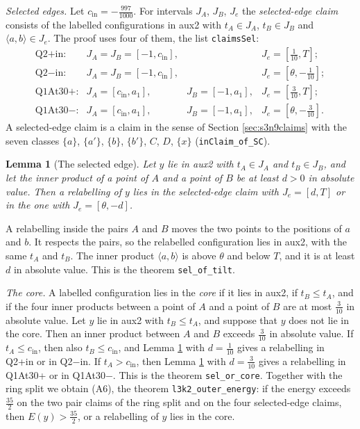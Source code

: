 \documentclass[reqno,a4paper,11pt]{amsart}
\numberwithin{equation}{section}
\newtheorem{lemma}[theorem]{Lemma}
\newcommand{\lean}[1]{\texttt{#1}}
\begin{document}
\emph{Selected edges.} Let $c_{\mathrm{in}} = -\tfrac{997}{1000}$. For intervals $J_A$, $J_B$, $J_e$ the \emph{selected-edge claim} consists of the labelled configurations in aux2 with $t_A \in J_A$, $t_B \in J_B$ and $\langle a, b \rangle \in J_e$. The proof uses four of them, the list \lean{claimsSel}:
$$
\begin{array}{llll}
\text{Q2+in:} & J_A = J_B = [-1, c_{\mathrm{in}}], & & J_e = [\tfrac{1}{10}, T]; \\[2pt]
\text{Q2$-$in:} & J_A = J_B = [-1, c_{\mathrm{in}}], & & J_e = [\theta, -\tfrac{1}{10}]; \\[2pt]
\text{Q1At30+:} & J_A = [c_{\mathrm{in}}, a_1], & J_B = [-1, a_1], & J_e = [\tfrac{3}{10}, T]; \\[2pt]
\text{Q1At30$-$:} & J_A = [c_{\mathrm{in}}, a_1], & J_B = [-1, a_1], & J_e = [\theta, -\tfrac{3}{10}].
\end{array}
$$
A selected-edge claim is a claim in the sense of Section \ref{sec:s3n9claims} with the seven classes $\{a\}$, $\{a'\}$, $\{b\}$, $\{b'\}$, $C$, $D$, $\{x\}$ (\lean{inClaim\_of\_SC}).

\begin{lemma}[The selected edge]\label{lma:seledge}
Let $y$ lie in aux2 with $t_A \in J_A$ and $t_B \in J_B$, and let the inner product of a point of $A$ and a point of $B$ be at least $d > 0$ in absolute value. Then a relabelling of $y$ lies in the selected-edge claim with $J_e = [d, T]$ or in the one with $J_e = [\theta, -d]$.
\end{lemma}

A relabelling inside the pairs $A$ and $B$ moves the two points to the positions of $a$ and $b$. It respects the pairs, so the relabelled configuration lies in aux2, with the same $t_A$ and $t_B$. The inner product $\langle a, b \rangle$ is above $\theta$ and below $T$, and it is at least $d$ in absolute value. This is the theorem \lean{sel\_of\_tilt}.

\emph{The core.} A labelled configuration lies in the \emph{core} if it lies in aux2, if $t_B \leq t_A$, and if the four inner products between a point of $A$ and a point of $B$ are at most $\tfrac{3}{10}$ in absolute value. Let $y$ lie in aux2 with $t_B \leq t_A$, and suppose that $y$ does not lie in the core. Then an inner product between $A$ and $B$ exceeds $\tfrac{3}{10}$ in absolute value. If $t_A \leq c_{\mathrm{in}}$, then also $t_B \leq c_{\mathrm{in}}$, and Lemma \ref{lma:seledge} with $d = \tfrac{1}{10}$ gives a relabelling in Q2+in or in Q2$-$in. If $t_A > c_{\mathrm{in}}$, then Lemma \ref{lma:seledge} with $d = \tfrac{3}{10}$ gives a relabelling in Q1At30+ or in Q1At30$-$. This is the theorem \lean{sel\_or\_core}. Together with the ring split we obtain (A6), the theorem \lean{l3k2\_outer\_energy}: if the energy exceeds $\tfrac{35}{2}$ on the two pair claims of the ring split and on the four selected-edge claims, then $E(y) > \tfrac{35}{2}$, or a relabelling of $y$ lies in the core.
\end{document}
